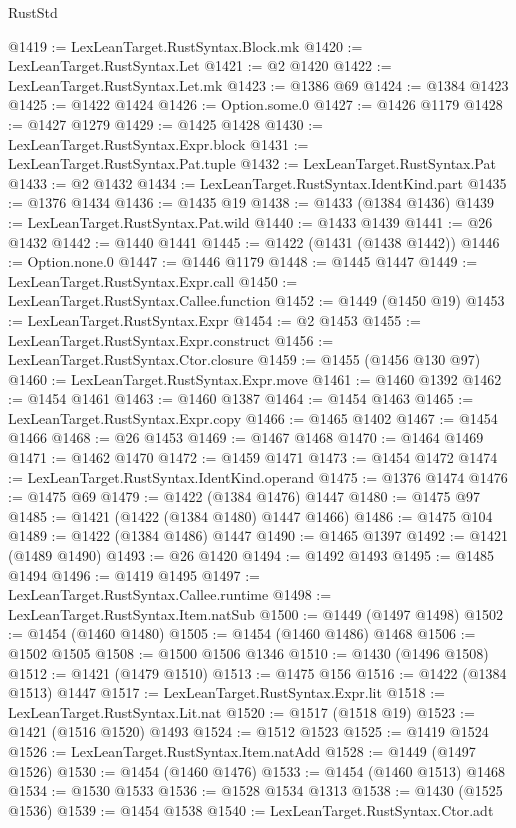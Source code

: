 \begin{lexlean}{RustStd}
\begin{coremodule}
@1419 := LexLeanTarget.RustSyntax.Block.mk
@1420 := LexLeanTarget.RustSyntax.Let
@1421 := @2 @1420
@1422 := LexLeanTarget.RustSyntax.Let.mk
@1423 := @1386 @69
@1424 := @1384 @1423
@1425 := @1422 @1424
@1426 := Option.some.{0}
@1427 := @1426 @1179
@1428 := @1427 @1279
@1429 := @1425 @1428
@1430 := LexLeanTarget.RustSyntax.Expr.block
@1431 := LexLeanTarget.RustSyntax.Pat.tuple
@1432 := LexLeanTarget.RustSyntax.Pat
@1433 := @2 @1432
@1434 := LexLeanTarget.RustSyntax.IdentKind.part
@1435 := @1376 @1434
@1436 := @1435 @19
@1438 := @1433 (@1384 @1436)
@1439 := LexLeanTarget.RustSyntax.Pat.wild
@1440 := @1433 @1439
@1441 := @26 @1432
@1442 := @1440 @1441
@1445 := @1422 (@1431 (@1438 @1442))
@1446 := Option.none.{0}
@1447 := @1446 @1179
@1448 := @1445 @1447
@1449 := LexLeanTarget.RustSyntax.Expr.call
@1450 := LexLeanTarget.RustSyntax.Callee.function
@1452 := @1449 (@1450 @19)
@1453 := LexLeanTarget.RustSyntax.Expr
@1454 := @2 @1453
@1455 := LexLeanTarget.RustSyntax.Expr.construct
@1456 := LexLeanTarget.RustSyntax.Ctor.closure
@1459 := @1455 (@1456 @130 @97)
@1460 := LexLeanTarget.RustSyntax.Expr.move
@1461 := @1460 @1392
@1462 := @1454 @1461
@1463 := @1460 @1387
@1464 := @1454 @1463
@1465 := LexLeanTarget.RustSyntax.Expr.copy
@1466 := @1465 @1402
@1467 := @1454 @1466
@1468 := @26 @1453
@1469 := @1467 @1468
@1470 := @1464 @1469
@1471 := @1462 @1470
@1472 := @1459 @1471
@1473 := @1454 @1472
@1474 := LexLeanTarget.RustSyntax.IdentKind.operand
@1475 := @1376 @1474
@1476 := @1475 @69
@1479 := @1422 (@1384 @1476) @1447
@1480 := @1475 @97
@1485 := @1421 (@1422 (@1384 @1480) @1447 @1466)
@1486 := @1475 @104
@1489 := @1422 (@1384 @1486) @1447
@1490 := @1465 @1397
@1492 := @1421 (@1489 @1490)
@1493 := @26 @1420
@1494 := @1492 @1493
@1495 := @1485 @1494
@1496 := @1419 @1495
@1497 := LexLeanTarget.RustSyntax.Callee.runtime
@1498 := LexLeanTarget.RustSyntax.Item.natSub
@1500 := @1449 (@1497 @1498)
@1502 := @1454 (@1460 @1480)
@1505 := @1454 (@1460 @1486) @1468
@1506 := @1502 @1505
@1508 := @1500 @1506 @1346
@1510 := @1430 (@1496 @1508)
@1512 := @1421 (@1479 @1510)
@1513 := @1475 @156
@1516 := @1422 (@1384 @1513) @1447
@1517 := LexLeanTarget.RustSyntax.Expr.lit
@1518 := LexLeanTarget.RustSyntax.Lit.nat
@1520 := @1517 (@1518 @19)
@1523 := @1421 (@1516 @1520) @1493
@1524 := @1512 @1523
@1525 := @1419 @1524
@1526 := LexLeanTarget.RustSyntax.Item.natAdd
@1528 := @1449 (@1497 @1526)
@1530 := @1454 (@1460 @1476)
@1533 := @1454 (@1460 @1513) @1468
@1534 := @1530 @1533
@1536 := @1528 @1534 @1313
@1538 := @1430 (@1525 @1536)
@1539 := @1454 @1538
@1540 := LexLeanTarget.RustSyntax.Ctor.adt

\end{coremodule}
\end{lexlean}
